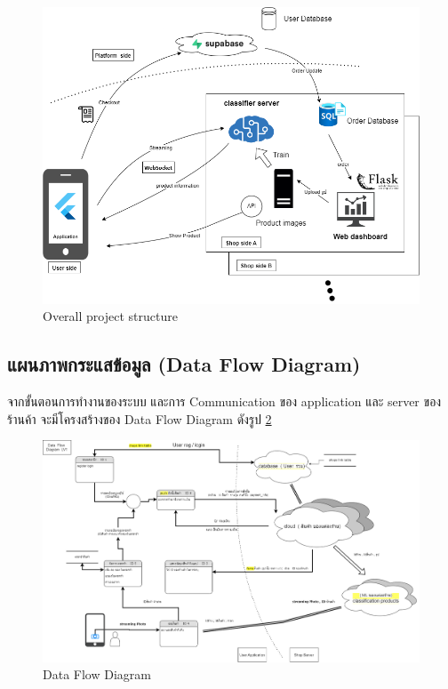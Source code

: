 \begin{figure}[h]
  \begin{center}

    \vspace{0.5cm}\includegraphics[scale=0.3]{pic/overall_2.png}
  \end{center}

  \caption[Overall project structure]{Overall project structure}
  \label{fig:Overall project structure}
\end{figure}

\newpage
\subsection{แผนภาพกระแสข้อมูล (Data Flow Diagram)}
จากขั้นตอนการทำงานของระบบ  และการ Communication ของ application และ server ของร้านค้า
จะมีโครงสร้างของ Data Flow Diagram ดังรูป \ref{fig:Data Flow Diagram}
\begin{figure}[h]
  \begin{center}

    \includegraphics[scale=0.25]{pic/dataflow-lv0.png}
  \end{center}

  \caption[Data Flow Diagram]{Data Flow Diagram}
  \label{fig:Data Flow Diagram}
\end{figure}



